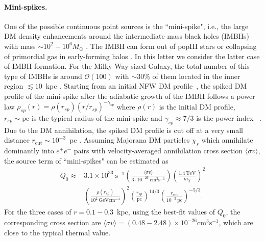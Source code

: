 \documentclass[aps,prl,twocolumn,a4paper]{revtex4}
\begin{document}
\paragraph{Mini-spikes.}
One of the possible continuous point sources is the ``mini-spike", 
i.e., the large DM density enhancements around the
intermediate mass black holes (IMBHs) with mass $\sim 10^{2}-10^{6} M_{\odot}$
\cite{
	Miller:2003sc,%
	Zhao:2005zr,%
	Bertone:2005xz,%
	Bertone:2009kj%
}.
The IMBH can form 
out of popIII stars
\cite{
	Heger:2002by%
} 
or collapsing of primordial gas in early-forming halos 
\cite{
	Koushiappas:2003zn%
}.
In this letter we consider the latter case of IMBH formation.
For the Milky Way-sized Galaxy, 
the total number of this type of IMBHs is around $\mathcal{O}(100)$
with $\sim 30\%$ of them located in the inner region $ \lesssim10$~kpc
\cite{
	Bertone:2005xz%
}.
Starting from an initial NFW DM profile~\cite{Navarro:1996gj}, 
the spiked DM profile of the mini-spike after the adiabatic growth
of the IMBH follows a power law
$\rho_{sp}(r)=\rho(r_{sp})(r/r_{sp})^{-\gamma_{sp}}$
where 
$\rho(r)$ is the initial DM profile,
$r_{sp}\sim \text{pc}$ is the typical radius of the mini-spike and 
$\gamma_{sp}\approx 7/3$ is the power index%
~\cite{
	Gondolo:1999ef%
}.
Due to the DM annihilation, the spiked DM profile is cut off at a very small distance  $r_{\text{cut}}\sim 10^{-3}$~pc
\cite{
	Bertone:2005xz%
}.
Assuming Majorana DM particles $\chi_{s}$ which annihilate dominantly 
into $e^{+}e^{-}$ pairs  with velocity-averaged  annihilation cross section 
$\langle \sigma v \rangle$, 
the source term of ``mini-spikes" can be estimated as 
\begin{align}\label{eq:Q0}
Q_{0}\approx
&3.1\times 10^{33}~\mbox{s}^{-1}
\left( \frac{\langle\sigma v\rangle}{3\cdot 10^{-26}~\mbox{cm}^{3}\mbox{s}^{-1}} \right) 
\left( \frac{1.4~\mbox{TeV}}{m_{\chi}} \right)^{2}
\nonumber\\
&\left(\frac{\rho(r_{sp})}{10^{2}~\mbox{GeV}\mbox{cm}^{-3}} \right)^{2}
\left(\frac{r_{sp}}{\mbox{pc}} \right)^{14/3}
\left( \frac{r_{\text{cut}}}{10^{-3}~\mbox{pc}}\right)^{-5/3}     .
\end{align}
For the three cases of 
$r=0.1-0.3$~kpc, using the best-fit values of $Q_{0}$, the corresponding cross section are
$\langle \sigma v \rangle=(0.48-2.48)\times 10^{-26}\text{cm}^{3}\text{s}^{-1}$, 
which are close to the typical thermal value.
\end{document}
